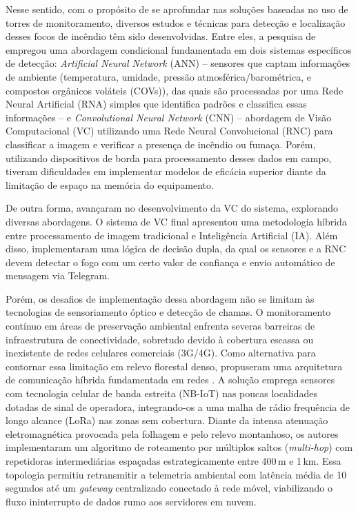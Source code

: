 Nesse sentido, com o propósito de se aprofundar nas soluções baseadas no uso de torres de
monitoramento, diversos estudos e técnicas para detecção e localização desses focos de incêndio têm sido desenvolvidas. Entre eles, a pesquisa de  empregou uma abordagem condicional fundamentada em dois sistemas específicos de detecção: \textit{Artificial Neural Network} (ANN) -- sensores que captam informações de ambiente (temperatura, umidade, pressão atmosférica/barométrica, e compostos orgânicos voláteis (COVs)), das quais são processadas por uma Rede Neural Artificial (RNA) simples que identifica padrões e classifica essas informações -- e \textit{Convolutional Neural Network} (CNN) -- abordagem de Visão Computacional (VC) utilizando uma Rede Neural Convolucional (RNC) para classificar a imagem e verificar a presença de incêndio ou fumaça. Porém, utilizando dispositivos de borda para processamento desses dados em campo, tiveram dificuldades em implementar modelos de eficácia superior diante da limitação de espaço na
memória do equipamento.

De outra forma,  avançaram no desenvolvimento da VC do sistema, explorando diversas abordagens. O sistema de VC final apresentou uma metodologia híbrida entre processamento de imagem tradicional e Inteligência Artificial (IA). Além disso, implementaram uma lógica de decisão dupla, da qual os sensores e a RNC devem detectar o fogo com um certo valor de confiança e envio automático de mensagem via Telegram.

Porém, os desafios de implementação dessa abordagem não se limitam às tecnologias de sensoriamento óptico e detecção de chamas. O monitoramento contínuo em áreas de preservação ambiental enfrenta severas barreiras de infraestrutura de conectividade, sobretudo devido à cobertura escassa ou inexistente de redes celulares comerciais (3G/4G). Como alternativa para contornar essa limitação em relevo florestal denso,  propuseram uma arquitetura de comunicação híbrida fundamentada em redes . A solução emprega sensores com tecnologia celular de banda estreita (NB-IoT) nas poucas localidades dotadas de sinal de operadora, integrando-os a uma malha de rádio frequência de longo alcance (LoRa) nas zonas sem cobertura. Diante da intensa atenuação eletromagnética provocada pela folhagem e pelo relevo montanhoso, os autores implementaram um algoritmo de roteamento por múltiplos saltos
(\textit{multi-hop}) com repetidoras intermediárias espaçadas estrategicamente entre 400\,m e 1\,km. Essa topologia permitiu retransmitir a telemetria ambiental com latência média de 10 segundos até um \textit{gateway} centralizado conectado à rede móvel, viabilizando o fluxo ininterrupto de dados rumo aos servidores em nuvem.


